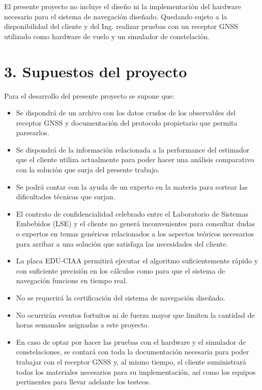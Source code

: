 \documentclass[11pt]{charter}
\begin{document}
El presente proyecto no incluye el diseño ni la implementación del hardware necesario para el sistema de navegación diseñado. Quedando sujeto a la disponibilidad del cliente y del Ing. \authorname{} realizar pruebas con un receptor GNSS utilizado como hardware de vuelo y un simulador de constelación.

\section{3. Supuestos del proyecto}
\label{sec:supuestos}

Para el desarrollo del presente proyecto se supone que: 

\begin{itemize}
\item Se dispondrá de un archivo con los datos crudos de los observables del receptor GNSS y documentación del protocolo propietario que permita parsearlos.
\item Se dispondrá de la información relacionada a la performance del estimador que el cliente utiliza actualmente para poder hacer una análisis comparativo con la solución que surja del presente trabajo.
\item Se podrá contar con la ayuda de un experto en la materia para sortear las dificultades técnicas que surjan.
\item El contrato de confidencialidad celebrado entre el Laboratorio de Sistemas Embebidos (LSE) y el cliente no generá inconvenientes para consultar dudas o expertos en temas genéricos relacionados a los aspectos teóricos necesarios para arribar a una solución que satisfaga las necesidades del cliente.
\item La placa EDU-CIAA permitirá ejecutar el algoritmo suficientemente rápido y con suficiente precisión en los cálculos como para que el sistema de navegación funcione en tiempo real.
\item No se requerirá la certificación del sistema de navegación diseñado.
\item No ocurrirán eventos fortuitos ni de fuerza mayor que limiten la cantidad de horas semanales asignadas a este proyecto. 
\item En caso de optar por hacer las pruebas con el hardware y el simulador de constelaciones, se contará con toda la documentación necesaria para poder trabajar con el receptor GNSS y, al mismo tiempo, el cliente suministrará todos los materiales necesarios para su implementación, así como los equipos pertinentes para llevar adelante los testeos.
\end{itemize}
\end{document}
